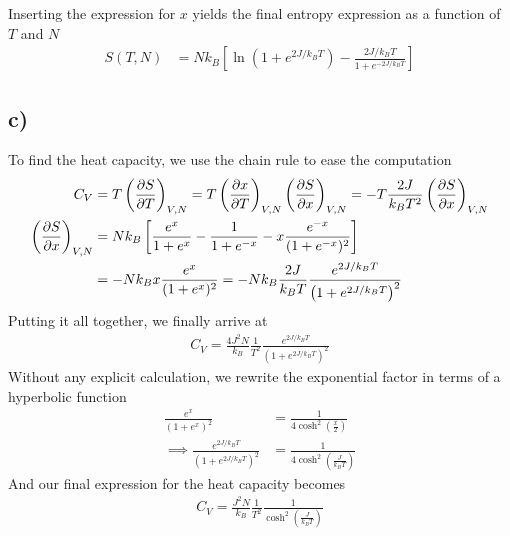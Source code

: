 \documentclass[reprint,english,notitlepage,aps,nobalancelastpage,nofootinbib]{revtex4-1}
\newcommand{\closed}[1]{\left(#1\right)}
\newcommand{\bracket}[1]{\left[#1\right]}
\newcommand{\tmdv}[4]{\closed{\pdv{#1}{#2}}_{#3,#4}}
\newcommand{\kb}{k_B}
\begin{document}
Inserting the expression for $x$ yields the final entropy expression as a function of $T$ and $N$
\begin{align}
	S(T,N) &= N\kb \bracket{\ln\closed{1+e^{2J/\kb T}} - \frac{2J/\kb T}{1+e^{-2J/\kb T}}}
\end{align}

\subsection*{c)}
To find the heat capacity, we use the chain rule to ease the computation 
\begin{align*}
	C_V &= T\tmdv{S}{T}{V}{N} = T \tmdv{x}{T}{V}{N}\tmdv{S}{x}{V}{N} = -T\frac{2J}{\kb T^2}\tmdv{S}{x}{V}{N} \\ 
	\tmdv{S}{x}{V}{N} &= N\kb \bracket{\frac{e^x}{1+e^x} - \frac{1}{1+e^{-x}} -x \frac{e^{-x}}{(1+e^{-x})^2} } \\ 
	&= - N\kb x \frac{e^x}{(1+e^x)^2} = -N\kb \frac{2J}{\kb T} \frac{e^{2J/\kb T}}{\closed{1+e^{2J/\kb T}}^2}
\end{align*}
Putting it all together, we finally arrive at 
\begin{align*}
	C_V = \frac{4J^2 N}{\kb} \frac{1}{T^2} \frac{e^{2J/\kb T}}{\closed{1+e^{2J/\kb T}}^2}
\end{align*}
Without any explicit calculation, we rewrite the exponential factor in terms of a hyperbolic function 
\begin{align*}
	\frac{e^x}{(1+e^x)^2} &= \frac{1}{4\cosh^2(\frac{x}{2})} \\
	\implies \frac{e^{2J/\kb T}}{\closed{1+e^{2J/\kb T}}^2} &= \frac{1}{4 \cosh^2\closed{\frac{J}{\kb T}}}
\end{align*}
And our final expression for the heat capacity becomes 
\begin{align}
	C_V = \frac{J^2 N}{\kb} \frac{1}{T^2} \frac{1}{\cosh^2\closed{\frac{J}{\kb T}}}
\end{align}
\end{document}
